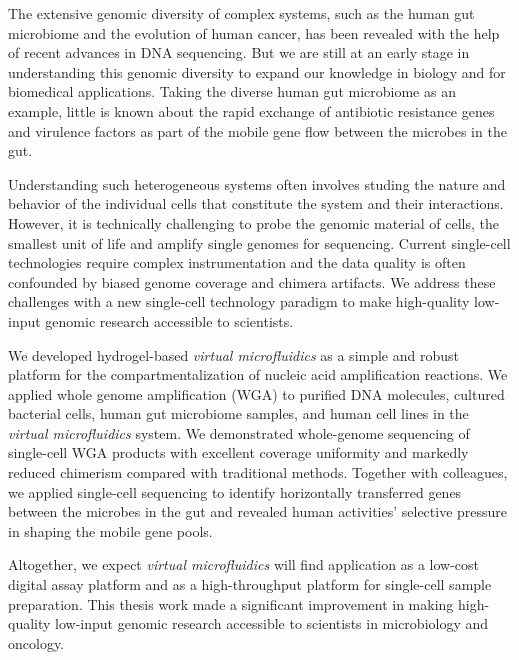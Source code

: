 % 
% 
%
The extensive genomic diversity of complex systems, such as the human gut microbiome and the evolution of human cancer, has been revealed with the help of recent advances in DNA sequencing. But we are still at an early stage in understanding this genomic diversity to expand our knowledge in biology and for biomedical applications. Taking the diverse human gut microbiome as an example, little is known about the rapid exchange of antibiotic resistance genes and virulence factors as part of the mobile gene flow between the microbes in the gut.

Understanding such heterogeneous systems often involves studing the nature and behavior of the individual cells that constitute the system and their interactions. However, it is technically challenging to probe the genomic material of cells, the smallest unit of life and amplify single genomes for sequencing. Current single-cell technologies require complex instrumentation and the data quality is often confounded by biased genome coverage and chimera artifacts. We address these challenges with a new single-cell technology paradigm to make high-quality low-input genomic research accessible to scientists. 

We developed hydrogel-based \textit{virtual microfluidics} as a simple and robust platform for the compartmentalization of nucleic acid amplification reactions. We applied whole genome amplification (WGA) to purified DNA molecules, cultured bacterial cells, human gut microbiome samples, and human cell lines in the \textit{virtual microfluidics} system. We demonstrated whole-genome sequencing of single-cell WGA products with excellent coverage uniformity and markedly reduced chimerism compared with traditional methods. Together with colleagues, we applied single-cell sequencing to identify horizontally transferred genes between the microbes in the gut and revealed human activities' selective pressure in shaping the mobile gene pools. 

Altogether, we expect \textit{virtual microfluidics} will find application as a low-cost digital assay platform and as a high-throughput platform for single-cell sample preparation. This thesis work made a significant improvement in making high-quality low-input genomic research accessible to scientists in microbiology and oncology. 
